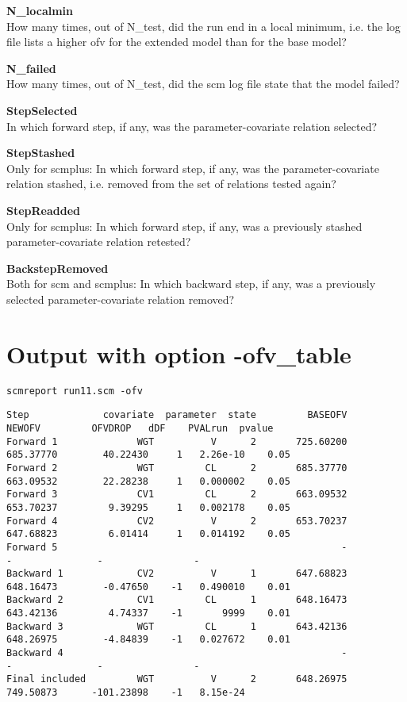 {\bfseries N\_localmin}\\
How many times, out of N\_test, did the run end in a local minimum, i.e. the log file lists a
higher ofv for the extended model than for the base model?

{\bfseries N\_failed}\\
How many times, out of N\_test, did the scm log file state that the model failed?

{\bfseries StepSelected} \\
In which forward step, if any, was the parameter-covariate relation selected?

{\bfseries StepStashed} \\
Only for scmplus: In which forward step, if any, was the parameter-covariate relation stashed, i.e. removed from the set of relations tested again?

{\bfseries StepReadded} \\
Only for scmplus: In which forward step, if any, was a previously stashed
parameter-covariate relation retested?

{\bfseries BackstepRemoved}\\ 
Both for scm and scmplus: 
In which backward step, if any, was a previously selected parameter-covariate relation removed?

\newpage

\section{Output with option -ofv\_table}
\begin{verbatim}
scmreport run11.scm -ofv
\end{verbatim}
{\tiny
\begin{verbatim}
Step             covariate  parameter  state         BASEOFV          NEWOFV         OFVDROP   dDF    PVALrun  pvalue
Forward 1              WGT          V      2       725.60200       685.37770        40.22430     1   2.26e-10    0.05
Forward 2              WGT         CL      2       685.37770       663.09532        22.28238     1   0.000002    0.05
Forward 3              CV1         CL      2       663.09532       653.70237         9.39295     1   0.002178    0.05
Forward 4              CV2          V      2       653.70237       647.68823         6.01414     1   0.014192    0.05
Forward 5                                                  -               -               -                -        
Backward 1             CV2          V      1       647.68823       648.16473        -0.47650    -1   0.490010    0.01
Backward 2             CV1         CL      1       648.16473       643.42136         4.74337    -1       9999    0.01
Backward 3             WGT         CL      1       643.42136       648.26975        -4.84839    -1   0.027672    0.01
Backward 4                                                 -               -               -                -        
Final included         WGT          V      2       648.26975       749.50873      -101.23898    -1   8.15e-24        
\end{verbatim}
}



